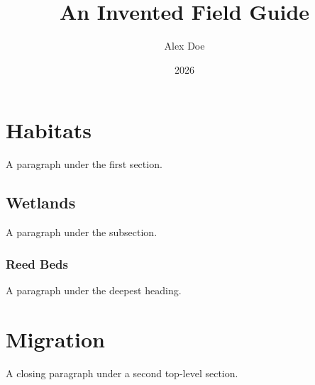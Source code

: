 \documentclass{article}
\title{An Invented Field Guide}
\author{Alex Doe}
\date{2026}
\begin{document}
\maketitle

\section{Habitats}

A paragraph under the first section.

\subsection{Wetlands}

A paragraph under the subsection.

\subsubsection{Reed Beds}

A paragraph under the deepest heading.

\section{Migration}

A closing paragraph under a second top-level section.
\end{document}
